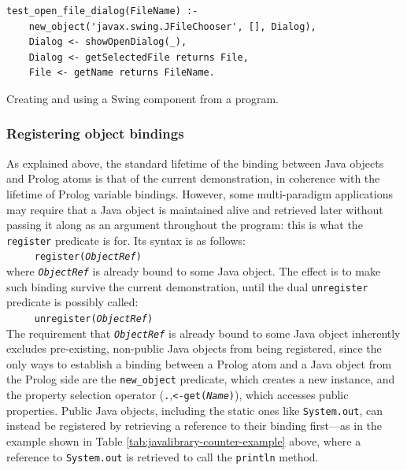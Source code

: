 \begin{table}
\begin{verbatim}
test_open_file_dialog(FileName) :-
    new_object('javax.swing.JFileChooser', [], Dialog),
    Dialog <- showOpenDialog(_),
    Dialog <- getSelectedFile returns File,
    File <- getName returns FileName.
\end{verbatim}
\caption{Creating and using a Swing component from a \tuprolog{} program.}
\label{tab:jexamples-swing}
\end{table}

\subsubsection{Registering object bindings}
\label{sssec:register(prolog)}

As explained above, the standard lifetime of the binding between Java objects and Prolog atoms is that of the current demonstration, in coherence with the lifetime of Prolog variable bindings.
However, some multi-paradigm applications may require that a Java object is maintained alive and retrieved later without passing it along as an argument throughout the program: this is what the \texttt{register} predicate is for.
Its syntax is as follows:\\

\texttt{~~~~~register(\textit{ObjectRef})}\\

\noindent where \texttt{\textit{ObjectRef}} is already bound to some Java object. The effect is to make such binding survive the current demonstration, until the dual \texttt{unregister} predicate is possibly called:\\

\texttt{~~~~~unregister(\textit{ObjectRef})}\\

\noindent The requirement that \texttt{\textit{ObjectRef}} is already bound to some Java object inherently excludes pre-existing, non-public Java objects from being registered, since the only ways to establish a binding between a Prolog atom and a Java object from the Prolog side are the \texttt{new\_object} predicate, which creates a new instance, and the property selection operator (\texttt{.},\texttt{<-get(\textit{Name})}), which accesses public properties.
%
Public Java objects, including the static ones like \texttt{System.out}, can instead be registered by retrieving a reference to their binding first---as in the example shown in Table \ref{tab:javalibrary-counter-example} above, where a reference to \texttt{System.out} is retrieved to call the \texttt{println} method.

